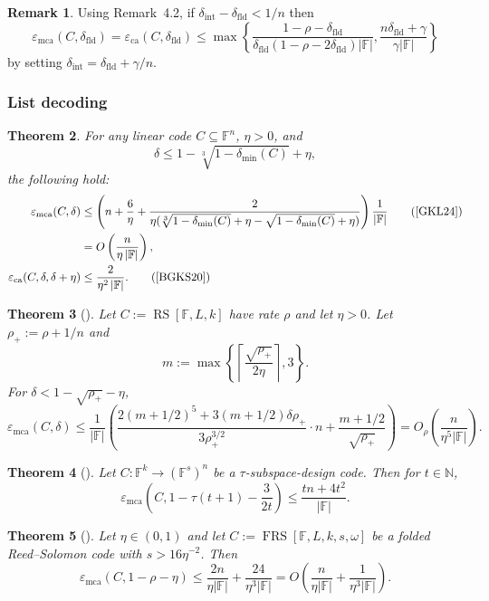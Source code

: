 \documentclass[11pt]{article}
\theoremstyle{plain}
\newtheorem{theorem}{Theorem}[section]
\theoremstyle{definition}
\newtheorem{remark}[theorem]{Remark}
\newcommand{\F}{\mathbb{F}}
\newcommand{\N}{\mathbb{N}}
\newcommand{\RS}[3]{\operatorname{RS}[#1,#2,#3]}
\newcommand{\FRS}[5]{\operatorname{FRS}[#1,#2,#3,#4,#5]}
\newcommand{\epsca}{\varepsilon_{\mathrm{ca}}}
\newcommand{\epsmca}{\varepsilon_{\mathrm{mca}}}
\newcommand{\distmin}{\delta_{\min}}
\newcommand{\fld}{\mathrm{fld}}
\newcommand{\intr}{\mathrm{int}}
\newcommand{\abs}[1]{\left|#1\right|}
\begin{document}
\begin{remark}
Using Remark~4.2, if $\delta_{\intr}-\delta_{\fld}<1/n$ then
\[
\epsmca(C,\delta_{\fld})=\epsca(C,\delta_{\fld})
\le
\max\left\{
\frac{1-\rho-\delta_{\fld}}{\delta_{\fld}(1-\rho-2\delta_{\fld})\abs{\F}},
\frac{n\delta_{\fld}+\gamma}{\gamma\abs{\F}}
\right\}
\]
by setting $\delta_{\intr}=\delta_{\fld}+\gamma/n$.
\end{remark}

\subsubsection{List decoding}

\begin{theorem}
For any linear code $C\subseteq\F^n$, $\eta>0$, and
\[
  \delta\le 1-\sqrt[3]{1-\distmin(C)}+\eta,
\]
the following hold:
\begin{align*}
\epsmca(C,\delta)&\le
\left(n+\frac6\eta+
\frac{2}{\eta(\sqrt[3]{1-\distmin(C)}+\eta-\sqrt{1-\distmin(C)}+\eta)}\right)\frac1{\abs{\F}}\tag{\cite{GKL24}}\\
&=O\left(\frac{n}{\eta\abs{\F}}\right),\\
\epsca(C,\delta,\delta+\eta)&\le \frac{2}{\eta^2\abs{\F}}.\tag{\cite{BGKS20}}
\end{align*}
\end{theorem}

\begin{theorem}[\cite{BCHKS25}]
Let $C:=\RS{\F}{L}{k}$ have rate $\rho$ and let $\eta>0$. Let $\rho_+:=\rho+1/n$ and
\[
  m:=\max\left\{\left\lceil\frac{\sqrt{\rho_+}}{2\eta}\right\rceil,3\right\}.
\]
For $\delta<1-\sqrt{\rho_+}-\eta$,
\[
\epsmca(C,\delta)
\le
\frac1{\abs{\F}}\left(
\frac{2(m+1/2)^5+3(m+1/2)\delta\rho_+}{3\rho_+^{3/2}}\cdot n
+\frac{m+1/2}{\sqrt{\rho_+}}
\right)
=O_\rho\left(\frac{n}{\eta^5\abs{\F}}\right).
\]
\end{theorem}

\begin{theorem}[\cite{GG25}]
Let $C:\F^k\to(\F^s)^n$ be a $\tau$-subspace-design code. Then for $t\in\N$,
\[
  \epsmca\left(C,1-\tau(t+1)-\frac{3}{2t}\right)
  \le \frac{tn+4t^2}{\abs{\F}}.
\]
\end{theorem}

\begin{theorem}[\cite{GG25}]
Let $\eta\in(0,1)$ and let $C:=\FRS{\F}{L}{k}{s}{\omega}$ be a folded Reed--Solomon code with $s>16\eta^{-2}$. Then
\[
  \epsmca(C,1-\rho-\eta)
  \le \frac{2n}{\eta\abs{\F}}+\frac{24}{\eta^3\abs{\F}}
  =O\left(\frac{n}{\eta\abs{\F}}+\frac{1}{\eta^3\abs{\F}}\right).
\]
\end{theorem}
\end{document}
